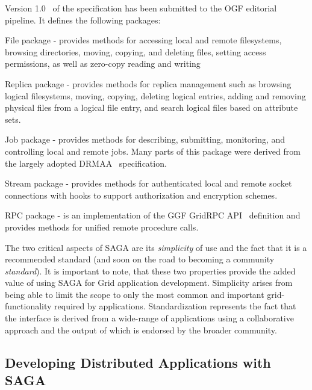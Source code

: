 \documentclass{llncs}
\begin{document}
\noindent Version 1.0~\cite{saga-core} of the specification has been submitted
to the OGF editorial pipeline.  It defines the following packages:
\begin{compactitem}
\item File package - provides methods for accessing local and remote
  filesystems, browsing directories, moving, copying, and deleting
  files, setting access permissions, as well as zero-copy reading and
  writing
\item Replica package - provides methods for replica management such
  as browsing logical filesystems, moving, copying, deleting logical
  entries, adding and removing physical files from a logical file
  entry, and search logical files based on attribute sets.
\item Job package - provides methods for describing, submitting,
  monitoring, and controlling local and remote jobs. Many parts of
  this package were derived from the largely adopted
  DRMAA~\cite{drmaa_url} specification.
\item Stream package - provides methods for authenticated local and
  remote socket connections with hooks to support authorization and
  encryption schemes.
\item RPC package - is an implementation of the GGF GridRPC
  API~\cite{gridrpc_url} definition and provides methods for unified
  remote procedure calls.
\end{compactitem}

The two critical aspects of SAGA are its {\it simplicity} of use and
the fact that it is a recommended standard (and soon on the road to
becoming a community {\it standard}).  It is important to note, that
these two properties provide the added value of using SAGA for Grid
application development.  Simplicity arises from being able to limit
the scope to only the most common and important grid-functionality
required by applications.  Standardization represents the fact that
the interface is derived from a wide-range of applications using a
collaborative approach and the output of which is endorsed by the
broader community.

\up

\subsection{Developing Distributed Applications with SAGA}

\up
\end{document}
